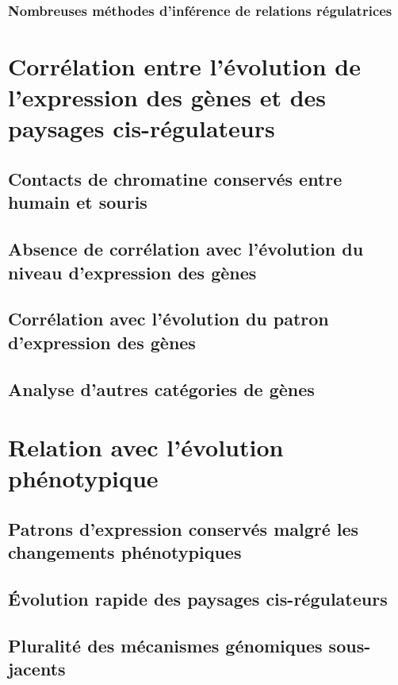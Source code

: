 \subsubsection*{Nombreuses méthodes d'inférence de relations régulatrices}

\section{Corrélation entre l’évolution de l’expression des gènes et des paysages cis-régulateurs}

\subsection{Contacts de chromatine conservés entre humain et souris}
\subsection{Absence de corrélation avec l’évolution du niveau d’expression des gènes}
\subsection{Corrélation avec l’évolution du patron d’expression des gènes}
\subsection{Analyse d’autres catégories de gènes}

\section{Relation avec l’évolution phénotypique}
\subsection{Patrons d’expression conservés malgré les changements phénotypiques}
\subsection{Évolution rapide des paysages cis-régulateurs}
\subsection{Pluralité des mécanismes génomiques sous-jacents}
